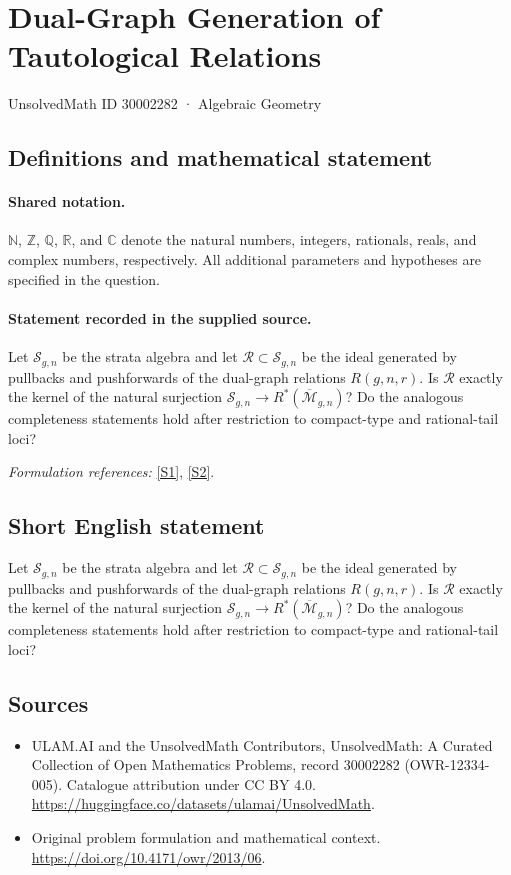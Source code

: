 \documentclass[11pt]{article}
\newcommand{\sref}[2]{\hyperlink{source:#1:#2}{[S#2]}}
\begin{document}
\setcounter{section}{30002281}
\section{Dual-Graph Generation of Tautological Relations}\label{30002282}
{\small UnsolvedMath ID 30002282 · Algebraic Geometry}
\subsection{Definitions and mathematical statement}

\paragraph{Shared notation.}$\mathbb N$, $\mathbb Z$, $\mathbb Q$, $\mathbb R$, and $\mathbb C$ denote the natural numbers, integers, rationals, reals, and complex numbers, respectively. All additional parameters and hypotheses are specified in the question.


\paragraph{Statement recorded in the supplied source.}
Let $\mathcal S_{g,n}$ be the strata algebra and let $\mathcal R\subset\mathcal S_{g,n}$ be the ideal generated by pullbacks and pushforwards of the dual-graph relations $R(g,n,r)$. Is $\mathcal R$ exactly the kernel of the natural surjection $\mathcal S_{g,n}\to R^*(\overline{\mathcal M}_{g,n})$? Do the analogous completeness statements hold after restriction to compact-type and rational-tail loci?
\par\smallskip\textit{Formulation references:} \sref{30002282}{1}, \sref{30002282}{2}.
\subsection{Short English statement}
Let $\mathcal S_{g,n}$ be the strata algebra and let $\mathcal R\subset\mathcal S_{g,n}$ be the ideal generated by pullbacks and pushforwards of the dual-graph relations $R(g,n,r)$. Is $\mathcal R$ exactly the kernel of the natural surjection $\mathcal S_{g,n}\to R^*(\overline{\mathcal M}_{g,n})$? Do the analogous completeness statements hold after restriction to compact-type and rational-tail loci?
\subsection{Sources}
\begin{itemize}
\item[\hypertarget{source:30002282:1}{S1}] ULAM.AI and the UnsolvedMath Contributors, UnsolvedMath: A Curated Collection of Open Mathematics Problems, record 30002282 (OWR-12334-005). Catalogue attribution under CC BY 4.0.
\url{https://huggingface.co/datasets/ulamai/UnsolvedMath}.
\item[\hypertarget{source:30002282:2}{S2}] Original problem formulation and mathematical context.
\url{https://doi.org/10.4171/owr/2013/06}.
\end{itemize}
\label{end:30002282}
\end{document}
